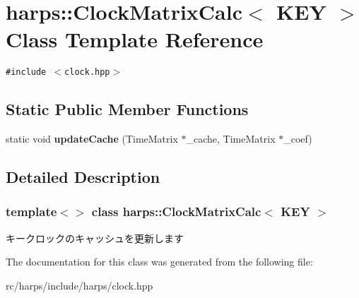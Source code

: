 \section{harps::ClockMatrixCalc$<$ KEY $>$ Class Template Reference}
\label{classharps_1_1ClockMatrixCalc_3_01KEY_01_4}
{\tt \#include $<$clock.hpp$>$}

\subsection*{Static Public Member Functions}
\begin{CompactItemize}
\item 
static void \textbf{updateCache} (TimeMatrix $\ast$\_\-cache, TimeMatrix $\ast$\_\-coef)\label{classharps_1_1ClockMatrixCalc_3_01KEY_01_4_e156e5b3173bbeab94687aa4a4262bac}

\end{CompactItemize}


\subsection{Detailed Description}
\subsubsection*{template$<$$>$ class harps::ClockMatrixCalc$<$ KEY $>$}

キークロックのキャッシュを更新します 

The documentation for this class was generated from the following file:\begin{CompactItemize}
\item 
rc/harps/include/harps/clock.hpp\end{CompactItemize}
